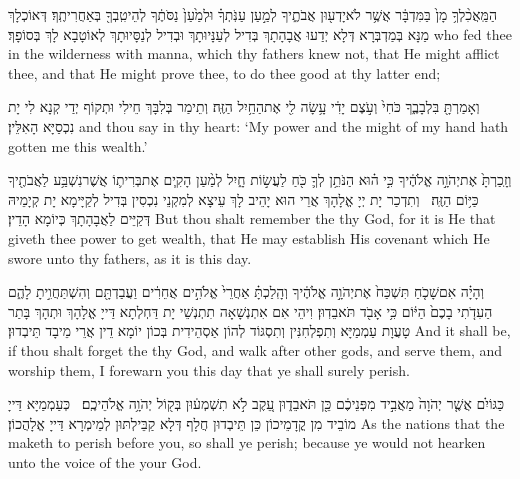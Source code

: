 {הַמַּֽאֲכִ֨לְךָ֥ מָן֙ בַּמִּדְבָּ֔ר אֲשֶׁ֥ר לֹא\maqqaf יָדְע֖וּן אֲבֹתֶ֑יךָ לְמַ֣עַן עַנֹּֽתְךָ֗ וּלְמַ֙עַן֙ נַסֹּתֶ֔ךָ לְהֵיטִֽבְךָ֖ בְּאַחֲרִיתֶֽךָ׃}
{דְּאוֹכְלָךְ מַנָּא בְּמַדְבְּרָא דְּלָא יְדַעוּ אֲבָהָתָךְ בְּדִיל לְעַנָּיוּתָךְ וּבְדִיל לְנַסָּיוּתָךְ לְאוֹטָבָא לָךְ בְּסוֹפָךְ׃}
{who fed thee in the wilderness with manna, which thy fathers knew not, that He might afflict thee, and that He might prove thee, to do thee good at thy latter end;}{}

{וְאָמַרְתָּ֖ בִּלְבָבֶ֑ךָ כֹּחִי֙ וְעֹ֣צֶם יָדִ֔י עָ֥שָׂה לִ֖י אֶת\maqqaf הַחַ֥יִל הַזֶּֽה׃}
{וְתֵימַר בְּלִבָּךְ חֵילִי וּתְקוֹף יְדַי קְנָא לִי יָת נִכְסַיָּא הָאִלֵּין׃}
{and thou say in thy heart: ‘My power and the might of my hand hath gotten me this wealth.’}{}

{וְזָֽכַרְתָּ֙ אֶת\maqqaf יְהֹוָ֣ה אֱלֹהֶ֔יךָ כִּ֣י ה֗וּא הַנֹּתֵ֥ן לְךָ֛ כֹּ֖חַ לַעֲשׂ֣וֹת חָ֑יִל לְמַ֨עַן הָקִ֧ים אֶת\maqqaf בְּרִית֛וֹ אֲשֶׁר\maqqaf נִשְׁבַּ֥ע לַאֲבֹתֶ֖יךָ כַּיּ֥וֹם הַזֶּֽה׃ \petucha }
{וְתִדְכַר יָת יְיָ אֱלָהָךְ אֲרֵי הוּא יָהֵיב לָךְ עֵיצָא לְמִקְנֵי נִכְסִין בְּדִיל לְקַיָּימָא יָת קְיָמֵיהּ דְּקַיֵּים לַאֲבָהָתָךְ כְּיוֹמָא הָדֵין׃}
{But thou shalt remember the \lord\space thy God, for it is He that giveth thee power to get wealth, that He may establish His covenant which He swore unto thy fathers, as it is this day.}{}

{וְהָיָ֗ה אִם\maqqaf שָׁכֹ֤חַ תִּשְׁכַּח֙ אֶת\maqqaf יְהֹוָ֣ה אֱלֹהֶ֔יךָ וְהָֽלַכְתָּ֗ אַחֲרֵי֙ אֱלֹהִ֣ים אֲחֵרִ֔ים וַעֲבַדְתָּ֖ם וְהִשְׁתַּחֲוִ֣יתָ לָהֶ֑ם הַעִדֹ֤תִי בָכֶם֙ הַיּ֔וֹם כִּ֥י אָבֹ֖ד תֹּאבֵדֽוּן׃}
{וִיהֵי אִם אִתְנְשָׁאָה תִתְנְשֵׁי יָת דַּחְלְתָא דַּייָ אֱלָהָךְ וּתְהָךְ בָּתַר טָעֲוָת עַמְמַיָּא וְתִפְלְחִנִּין וְתִסְגּוֹד לְהוֹן אַסְהֵידִית בְּכוֹן יוֹמָא דֵין אֲרֵי מֵיבָד תֵּיבְדוּן׃}
{And it shall be, if thou shalt forget the \lord\space thy God, and walk after other gods, and serve them, and worship them, I forewarn you this day that ye shall surely perish.}{}

{כַּגּוֹיִ֗ם אֲשֶׁ֤ר יְהֹוָה֙ מַאֲבִ֣יד מִפְּנֵיכֶ֔ם כֵּ֖ן תֹּאבֵד֑וּן עֵ֚קֶב לֹ֣א תִשְׁמְע֔וּן בְּק֖וֹל יְהֹוָ֥ה אֱלֹהֵיכֶֽם׃ \petucha }
{כְּעַמְמַיָּא דַּייָ מוֹבֵיד מִן קֳדָמֵיכוֹן כֵּן תֵּיבְדוּן חֲלָף דְּלָא קַבֵּילְתּוּן לְמֵימְרָא דַּייָ אֱלָהֲכוֹן׃}
{As the nations that the \lord\space maketh to perish before you, so shall ye perish; because ye would not hearken unto the voice of the \lord\space your God.}{}

